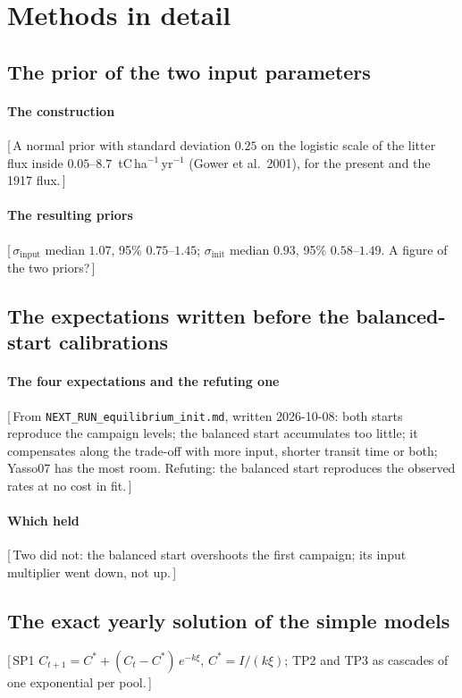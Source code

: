 \documentclass[11pt]{article}
\newcommand{\gap}[1]{\textcolor{red!70!black}{\small[\,#1\,]}}
\newcommand{\sinput}{\sigma_{\mathrm{input}}}
\newcommand{\sinit}{\sigma_{\mathrm{init}}}
\begin{document}
\section{Methods in detail}\label{supp:methods}
\subsection{The prior of the two input parameters}\label{supp:inputprior}
\paragraph{The construction}
\gap{A normal prior with standard deviation $0.25$ on the logistic scale of the litter flux inside
$0.05$--$8.7$~tC\,ha$^{-1}$\,yr$^{-1}$ (Gower et al.\ 2001), for the present and the 1917 flux.}
\paragraph{The resulting priors}
\gap{$\sinput$ median $1.07$, 95\% $0.75$--$1.45$; $\sinit$ median $0.93$, 95\% $0.58$--$1.49$.
A figure of the two priors?}
\subsection{The expectations written before the balanced-start calibrations}\label{supp:expectations}
\paragraph{The four expectations and the refuting one}
\gap{From \texttt{NEXT\_RUN\_equilibrium\_init.md}, written 2026-10-08: both starts reproduce the
campaign levels; the balanced start accumulates too little; it compensates along the trade-off
with more input, shorter transit time or both; Yasso07 has the most room. Refuting: the balanced
start reproduces the observed rates at no cost in fit.}
\paragraph{Which held}
\gap{Two did not: the balanced start overshoots the first campaign; its input multiplier went
down, not up.}
\subsection{The exact yearly solution of the simple models}\label{supp:exact}
\gap{SP1 $C_{t+1} = C^* + (C_t - C^*)\,e^{-k\xi}$, $C^* = I/(k\xi)$; TP2 and TP3 as cascades of
one exponential per pool.}
\end{document}
